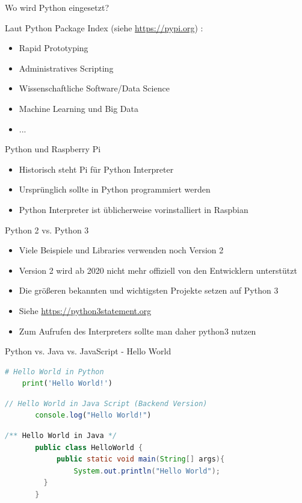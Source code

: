 \begin{frame}{Wo wird Python eingesetzt?}
 
 
 Laut Python Package Index (siehe \url{https://pypi.org}) :

    \begin{itemize}
        \item Rapid Prototyping
        \item Administratives Scripting
        \item Wissenschaftliche Software/Data Science
        \item Machine Learning und Big Data
        \item ...
     \end{itemize}
\end{frame}


\begin{frame}{Python und Raspberry Pi}
    \begin{itemize}
        \item Historisch steht Pi  für Python Interpreter
        \item Ursprünglich sollte in Python programmiert werden
        \item Python Interpreter ist üblicherweise vorinstalliert in Raspbian
     \end{itemize}
\end{frame}

\begin{frame}{Python 2 vs. Python 3}
 
 
    \begin{itemize}
        \item Viele Beispiele und Libraries verwenden noch Version 2
        \item Version 2 wird ab 2020 nicht mehr offiziell von den Entwicklern unterstützt
        \item Die größeren bekannten und wichtigsten Projekte setzen auf Python 3  
        \item Siehe \url{https://python3statement.org}
        \item Zum Aufrufen des Interpreters sollte man daher python3 nutzen
     \end{itemize}
\end{frame}


\begin{frame}[fragile]{Python vs. Java vs. JavaScript - Hello World}
\begin{lstlisting}[language=Python]
	# Hello World in Python
 	print('Hello World!') 
\end{lstlisting}
\begin{lstlisting}[language=JavaScript]
       // Hello World in Java Script (Backend Version)
       console.log("Hello World!") 
\end{lstlisting}
\begin{lstlisting}[language=Java]
       /** Hello World in Java */
       public class HelloWorld {
      	    public static void main(String[] args){
                System.out.println("Hello World");
      	 }
       }
\end{lstlisting}
\end{frame}


